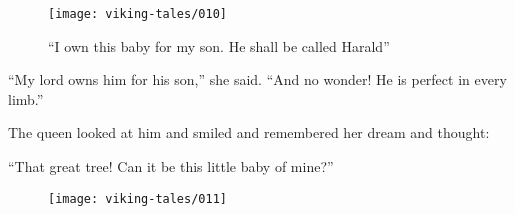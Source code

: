 \begin{figure}
    \centering
    \texttt{[image: viking-tales/010]}
    \caption{``I own this baby for my son. He shall be called Harald''}
\end{figure}

``My lord owns him for his son,'' she said. ``And no wonder! He is
perfect in every limb.''

The queen looked at him and smiled and remembered her dream and thought:

``That great tree! Can it be this little baby of mine?''

\begin{figure}[hb]
    \centering
    \vskip8pt
    \texttt{[image: viking-tales/011]}
\end{figure}
